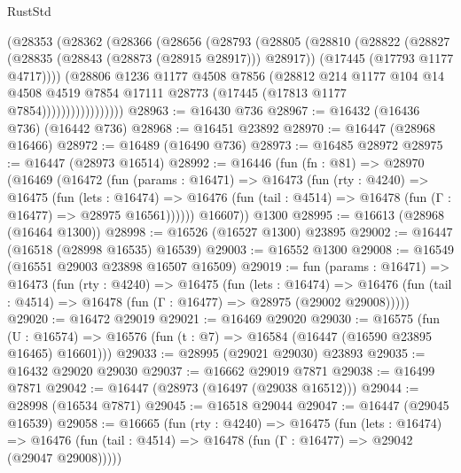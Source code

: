 \begin{lexlean}{RustStd}
\begin{coremodule}
                  (@28353
                    (@28362
                      (@28366
                        (@28656
                          (@28793
                            (@28805
                              (@28810
                                (@28822
                                  (@28827 (@28835 (@28843 (@28873 (@28915 @28917))) @28917))
                                  (@17445 (@17793 @1177 @4717))))
                              (@28806
                                @1236
                                @1177
                                @4508
                                @7856
                                (@28812
                                  @214
                                  @1177
                                  @104
                                  @14
                                  @4508
                                  @4519
                                  @7854
                                  @17111
                                  @28773
                                  (@17445 (@17813 @1177 @7854)))))))))))))))))
@28963 := @16430 @736
@28967 := @16432 (@16436 @736) (@16442 @736)
@28968 := @16451 @23892
@28970 := @16447 (@28968 @16466)
@28972 := @16489 (@16490 @736)
@28973 := @16485 @28972
@28975 := @16447 (@28973 @16514)
@28992 := @16446
    (fun (fn : @81) =>
    @28970
      (@16469
        (@16472
          (fun (params : @16471) =>
          @16473
            (fun (rty : @4240) =>
            @16475
              (fun (lets : @16474) =>
              @16476 (fun (tail : @4514) => @16478 (fun (Γ : @16477) => @28975 @16561))))))
        @16607))
    @1300
@28995 := @16613 (@28968 (@16464 @1300))
@28998 := @16526 (@16527 @1300) @23895
@29002 := @16447 (@16518 (@28998 @16535) @16539)
@29003 := @16552 @1300
@29008 := @16549 (@16551 @29003 @23898 @16507 @16509)
@29019 := fun (params : @16471) =>
  @16473
    (fun (rty : @4240) =>
    @16475
      (fun (lets : @16474) =>
      @16476 (fun (tail : @4514) => @16478 (fun (Γ : @16477) => @28975 (@29002 @29008)))))
@29020 := @16472 @29019
@29021 := @16469 @29020
@29030 := @16575
    (fun (U : @16574) => @16576 (fun (t : @7) => @16584 (@16447 (@16590 @23895 @16465) @16601)))
@29033 := @28995 (@29021 @29030) @23893
@29035 := @16432 @29020 @29030
@29037 := @16662 @29019 @7871
@29038 := @16499 @7871
@29042 := @16447 (@28973 (@16497 (@29038 @16512)))
@29044 := @28998 (@16534 @7871)
@29045 := @16518 @29044
@29047 := @16447 (@29045 @16539)
@29058 := @16665
    (fun (rty : @4240) =>
    @16475
      (fun (lets : @16474) =>
      @16476 (fun (tail : @4514) => @16478 (fun (Γ : @16477) => @29042 (@29047 @29008)))))

\end{coremodule}
\end{lexlean}

